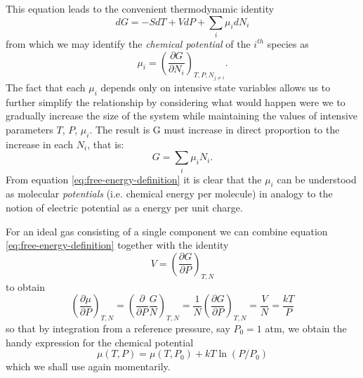 This equation leads to the convenient thermodynamic identity
\begin{equation}
  dG = -SdT + VdP + \sum_i \mu_i dN_i
\end{equation}
from which we may identify the \textit{chemical potential} of the $i^{th}$ species as
\begin{equation}
  \mu_i  = \left(\frac{\partial G}{\partial N_i} \right)_{T,P,N_{j\neq i}}.
\end{equation}
The fact that each $\mu_i$ depends only on intensive state variables allows us to further simplify the relationship by considering what would happen were we to gradually increase the size of the system while maintaining the values of intensive parameters $T$, $P$, $\mu_i$. The result is G must increase in direct proportion to the increase in each $N_i$, that is:
\begin{equation}
  \label{eq:free-energy-definition}
  G = \sum_i \mu_i N_i.
\end{equation}
From equation \ref{eq:free-energy-definition} it is clear that the $\mu_i$ can be understood as molecular \textit{potentials} (i.e. chemical energy per molecule) in analogy to the notion of electric potential as a energy per unit charge.


For an ideal gas consisting of a single component we can combine equation \ref{eq:free-energy-definition} together with the identity
\begin{equation}
  V = \left(\frac{\partial G}{\partial P}\right)_{T,N}
\end{equation}
to obtain
\begin{equation}
  \left(\frac{\partial \mu}{\partial P}\right)_{T,N} = \left(\frac{\partial}{\partial P}\frac{G}{N}\right)_{T,N} = \frac{1}{N}\left(\frac{\partial G}{\partial P} \right)_{T,N} = \frac{V}{N} = \frac{kT}{P}
\end{equation}
so that by integration from a reference pressure, say $P_0= 1$ atm, we obtain the handy expression for the chemical potential
\begin{equation}
  \label{eq:mu-ideal}
  \mu(T,P) = \mu(T,P_0) + kT\ln(P/P_0)
\end{equation}
which we shall use again momentarily.


